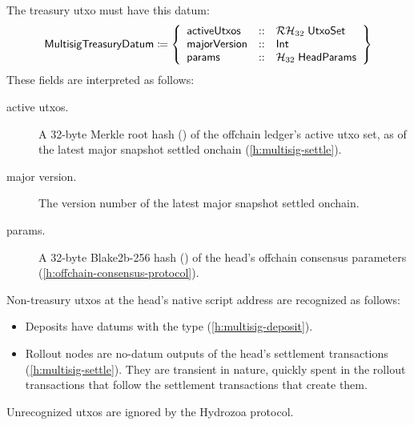 \documentclass[../hydrozoa.tex]{subfiles}
\begin{document}
The treasury utxo must have this datum:
\begin{equation*}
  \mathsf{MultisigTreasuryDatum} \coloneq \left\{
    \begin{array}{lll}
      \mathsf{activeUtxos}  &::& \mathcal{RH}_{32} \; \mathsf{UtxoSet} \\
      \mathsf{majorVersion} &::& \mathsf{Int} \\
      \mathsf{params} &::& \mathcal{H}_{32} \; \mathsf{HeadParams}
    \end{array}\right\}
\end{equation*}
These fields are interpreted as follows:
\begin{description}
  \item[active utxos.] A 32-byte Merkle root hash () of the offchain ledger's active utxo set, as of the latest major snapshot settled onchain (\cref{h:multisig-settle}).
  \item[major version.] The version number of the latest major snapshot settled onchain.
  \item[params.] A 32-byte Blake2b-256 hash () of the head's offchain consensus parameters (\cref{h:offchain-consensus-protocol}).
\end{description}

Non-treasury utxos at the head's native script address are recognized as follows:
\begin{itemize}
  \item Deposits have datums with the  type (\cref{h:multisig-deposit}).
  \item Rollout nodes are no-datum outputs of the head's settlement transactions (\cref{h:multisig-settle}).
    They are transient in nature, quickly spent in the rollout transactions that follow the settlement transactions that create them.
\end{itemize}

Unrecognized utxos are ignored by the Hydrozoa protocol.
\end{document}
